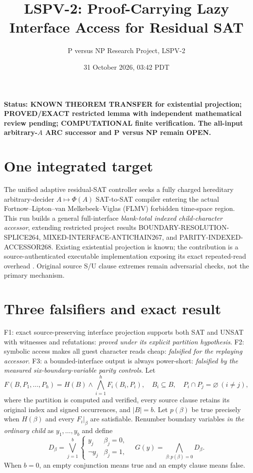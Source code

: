 \documentclass[11pt]{article}
\title{LSPV-2: Proof-Carrying Lazy Interface Access for Residual SAT}
\author{P versus NP Research Project, LSPV-2}
\date{31 October 2026, 03:42 PDT}
\begin{document}
\maketitle
\noindent\textbf{Status: KNOWN THEOREM TRANSFER for existential projection; PROVED/EXACT restricted lemma with independent mathematical review pending; COMPUTATIONAL finite verification. The all-input arbitrary-$A$ ARC successor and P versus NP remain OPEN.}
\section{One integrated target}
The unified adaptive residual-SAT controller seeks a fully charged hereditary arbitrary-decider $A\mapsto\Phi(A)$ SAT-to-SAT compiler entering the actual Fortnow--Lipton--van Melkebeek--Viglas (FLMV) forbidden time-space region. This run builds a general full-interface \emph{blank-total indexed child-character accessor}, extending restricted project results BOUNDARY-RESOLUTION-SPLICE264, MIXED-INTERFACE-ANTICHAIN267, and PARITY-INDEXED-ACCESSOR268. Existing existential projection is known; the contribution is a source-authenticated executable implementation exposing its exact repeated-read overhead \cite{dechter1999,darwiche2002}. Original source S/U clause extremes remain adversarial checks, not the primary mechanism.

\section{Three falsifiers and exact result}
F1: exact source-preserving interface projection supports both SAT and UNSAT with witnesses and refutations: \emph{proved under its explicit partition hypothesis}. F2: symbolic access makes all guest character reads cheap: \emph{falsified for the replaying accessor}. F3: a bounded-interface output is always power-short: \emph{falsified by the measured six-boundary-variable parity controls}.
Let
\[
F(B,P_1,\ldots,P_h)=H(B)\land\bigwedge_{i=1}^h F_i(B_i,P_i),
\quad B_i\subseteq B,\quad P_i\cap P_j=\varnothing\ (i\neq j),
\]
where the partition is computed and verified, every source clause retains its original index and signed occurrences, and $|B|=b$. Let $p(\beta)$ be true precisely when $H(\beta)$ and every $F_i|_\beta$ are satisfiable. Renumber boundary variables \emph{in the ordinary child} as $y_1,\ldots,y_b$ and define
\[
D_\beta=\bigvee_{j=1}^b \begin{cases}
y_j&\beta_j=0,\\
\neg y_j&\beta_j=1,
\end{cases}\quad
G(y)=\bigwedge_{\beta:p(\beta)=0}D_\beta.
\]
When $b=0$, an empty conjunction means true and an empty clause means false.
\end{document}
